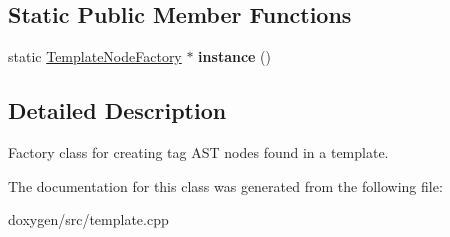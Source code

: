 \subsection*{Static Public Member Functions}
\begin{DoxyCompactItemize}
\item 
\mbox{\label{class_template_node_factory_ab70bb43cedfb3ac75cec15d97391b6f9}} 
static \mbox{\hyperlink{class_template_node_factory}{Template\+Node\+Factory}} $\ast$ {\bfseries instance} ()
\end{DoxyCompactItemize}


\subsection{Detailed Description}
Factory class for creating tag A\+ST nodes found in a template. 

The documentation for this class was generated from the following file\+:\begin{DoxyCompactItemize}
\item 
doxygen/src/template.\+cpp\end{DoxyCompactItemize}
